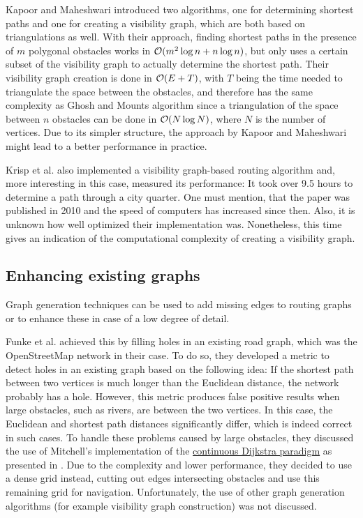 		Kapoor and Maheshwari introduced two algorithms, one for determining shortest paths and one for creating a visibility graph, which are both based on triangulations as well\cite{kapoor-shortest-path-vgraph}.
		With their approach, finding shortest paths in the presence of $m$ polygonal obstacles works in $\mathcal{O}(m^2 \log{n} + n\log{n})$, but only uses a certain subset of the visibility graph to actually determine the shortest path.
		Their visibility graph creation is done in $\mathcal{O}(E+T)$, with $T$ being the time needed to triangulate the space between the obstacles, and therefore has the same complexity as Ghosh and Mounts algorithm since a triangulation of the space between $n$ obstacles can be done in $\mathcal{O}(N \log{N})$\cite{tereshchenko-triangulating-open-spaces}, where $N$ is the number of vertices.
		Due to its simpler structure, the approach by Kapoor and Maheshwari might lead to a better performance in practice.

		Krisp et al. also implemented a visibility graph-based routing algorithm and, more interesting in this case, measured its performance\cite{krisp-goal-directed-routing}:
		It took over 9.5 hours to determine a path through a city quarter.
		One must mention, that the paper was published in 2010 and the speed of computers has increased since then.
		Also, it is unknown how well optimized their implementation was.
		Nonetheless, this time gives an indication of the computational complexity of creating a visibility graph.
	
	\subsection{Enhancing existing graphs}
	
		Graph generation techniques can be used to add missing edges to routing graphs or to enhance these in case of a low degree of detail.
		
		Funke et al. achieved this by filling holes in an existing road graph, which was the OpenStreetMap network in their case\cite{funke-osm-extrapolation}.
		To do so, they developed a metric to detect holes in an existing graph based on the following idea:
		If the shortest path between two vertices is much longer than the Euclidean distance, the network probably has a hole.
		However, this metric produces false positive results when large obstacles, such as rivers, are between the two vertices.
		In this case, the Euclidean and shortest path distances significantly differ, which is indeed correct in such cases.
		To handle these problems caused by large obstacles, they discussed the use of Mitchell's implementation of the \hyperref[subsec:continuous-dijkstra]{continuous Dijkstra paradigm} as presented in .
		Due to the complexity and lower performance, they decided to use a dense grid instead, cutting out edges intersecting obstacles and use this remaining grid for navigation.
		Unfortunately, the use of other graph generation algorithms (for example visibility graph construction) was not discussed.
		
